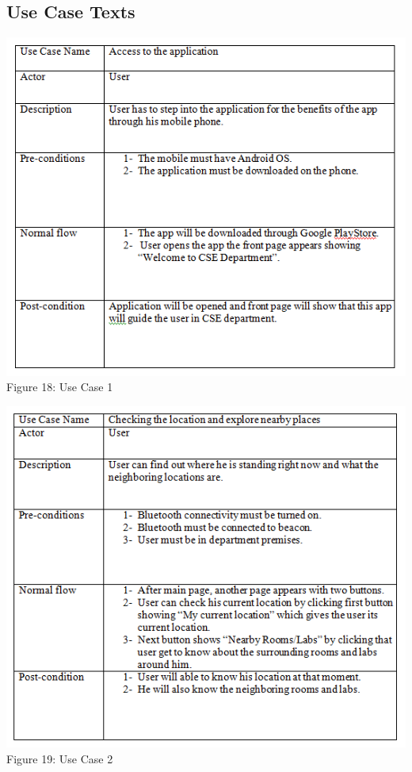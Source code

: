 \documentclass{article}
\begin{document}
\subsection{Use Case Texts}
\begin{center}
\includegraphics[scale=0.8]{uc1}
\\Figure 18: Use Case 1
\end{center}
\begin{center}
\includegraphics[scale=0.8]{uc2}
\\Figure 19: Use Case 2
\end{center}
\end{document}
